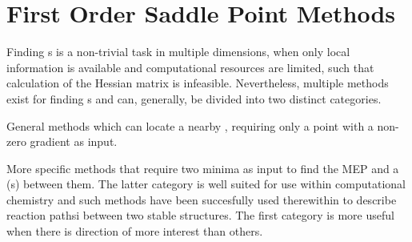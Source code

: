 \chapter{First Order Saddle Point Methods}
\label{chap:saddle-point-methods}

Finding \sap{}s is a non-trivial task in multiple dimensions, when only local information is available and computational resources are limited, such that calculation of the Hessian matrix is infeasible.
Nevertheless, multiple methods exist for finding s and can, generally, be divided into two distinct categories.
\item General methods which can locate a nearby , requiring only a point with a non-zero gradient as input.
\item More specific methods that require two minima as input to find the MEP and a  (s) between them.
\een
The latter category is well suited for use within computational chemistry and such methods have been succesfully used therewithin to describe reaction pathsi between two stable structures.\citemiss
The first category is more useful when there is direction of more interest than others.

\expand {}




